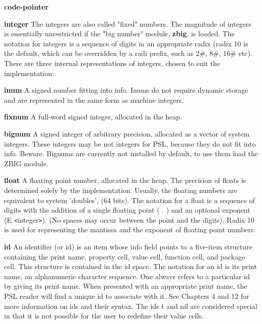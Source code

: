 \begin{Ventry}{\bf code-pointer}
\item [{\bf integer}]  The  integers  are   also called  "fixed" numbers.
            The magnitude of integers is essentially unrestricted if
            the "big number" module, {\bf zbig}, is loaded. The notation for
            integers is  a  sequence  of digits in an appropriate
												radix (radix 10 is the default, which can be overridden
           	by a radi prefix, such as 2\#, 8\#, 16\# etc). There are
												three internal representations of integers, chosen  to
            suit the implementation:

\item [{\bf inum}] 	A signed number fitting into info.
                       Inums do not require dynamic storage
                       and are represented in the same form
                      as machine integers. 

\item [{\bf fixnum}] 	A full-word signed integer,
                       allocated in the heap.

\item [{\bf bignum}]   A signed integer of arbitrary precision,
			allocated as a vector of
                       system integers. These integers may be not
                       integers for PSL, because they do not fit into info.
			Beware. Bignums are currently not
                       installed  by  default, to use them
                       load the ZBIG module. 

\item [{\bf float}]    A floating point number, allocated in the heap.
			The precision of floats
			is determined solely by the implementation. 
			Usually, the floating numbers are equivalent
			to system 'doubles', (64 bits).
			The notation for a float is a sequence of digits
			with the addition of  a  single floating  point
			( . ) and an optional exponent
			(E \verb+<+integer\verb+>+).
			(No  spaces  may  occur between the point and
			the  digits). Radix 10 is used for representing
			the  mantissa  and  the  exponent  of floating
			point numbers.

\item [{\bf id}]       An identifier (or id) is an item whose info field
			points to a  five-item  structure  containing  the
			print  name,  property  cell, value cell, function
			cell, and  package  cell. This structure is contained
			in the id space. The notation for an id is  its 
			print  name,  an  alphanumeric  character sequence.
			One always refers to a particular id by giving its
			print name.   When  presented  with  an appropriate
			print name, the PSL reader will find a unique  id 
			to  associate with it.  See Chapters 4 and 12 for 
			more  information  on  ids  and  their syntax.
			The ids t and nil are considered special in that 
			it  is  not  possible  for  the  user  to redefine
			their value cells.


\end{Ventry}
